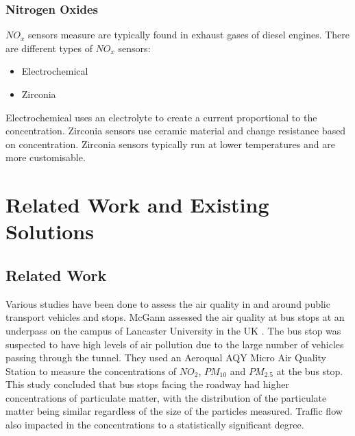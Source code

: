 \subsubsection{Nitrogen Oxides}
${NO_x}$ sensors measure are typically found in exhaust gases of diesel engines\cite{autolintec:noxsensor}. There are different types of ${NO_x}$ sensors\cite{drivearchive:noxsensor}:
\begin{itemize}
	\item Electrochemical
	\item Zirconia
\end{itemize}
Electrochemical uses an electrolyte to create a current proportional to the concentration.
Zirconia sensors use ceramic material and change resistance based on concentration.
Zirconia sensors typically run at lower temperatures and are more customisable\cite{miura2006electrochemical}.

\section{Related Work and Existing Solutions}
\subsection{Related Work}

Various studies have been done to assess the air quality in and around public transport vehicles and stops. 
McGann assessed the air quality at bus stops at an underpass on the campus of Lancaster University in the UK \cite{busstop}. The bus stop was suspected to have high levels of air pollution due to the large number of vehicles passing through the tunnel. They used an Aeroqual AQY Micro Air Quality Station to measure the concentrations of $NO_2$, $PM_{10}$ and $PM_{2.5}$ at the bus stop. 
This study concluded that bus stops facing the roadway had higher concentrations of particulate matter, with the distribution of the particulate matter being similar regardless of the size of the particles measured. Traffic flow also impacted in the concentrations to a statistically significant degree.

